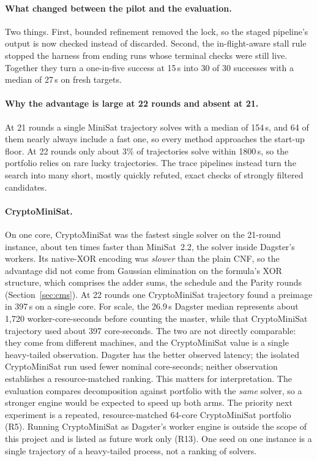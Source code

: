 \documentclass[11pt,a4paper]{article}
\begin{document}
\paragraph{What changed between the pilot and the evaluation.} Two things. First, bounded refinement
removed the lock, so the staged pipeline's output is now checked instead of discarded. Second, the
in-flight-aware stall rule stopped the harness from ending runs whose terminal checks were still
live. Together they turn a one-in-five success at 15\,s into 30 of 30 successes with a median of
27\,s on fresh targets.

\paragraph{Why the advantage is large at 22 rounds and absent at 21.} At 21 rounds a single MiniSat
trajectory solves with a median of 154\,s, and 64 of them nearly always include a fast one, so every
method approaches the start-up floor. At 22 rounds only about 3\% of trajectories solve within
1800\,s, so the portfolio relies on rare lucky trajectories. The trace pipelines instead turn the
search into many short, mostly quickly refuted, exact checks of strongly filtered candidates.

\paragraph{CryptoMiniSat.} On one core, CryptoMiniSat was the fastest single solver on the
21-round instance, about ten times faster than MiniSat~2.2, the solver inside Dagster's workers. Its
native-XOR encoding was \emph{slower} than the plain CNF, so the advantage did not come from Gaussian
elimination on the formula's XOR structure, which comprises the adder sums, the schedule and the
Parity rounds (Section~\ref{sec:cms}). At 22 rounds one CryptoMiniSat trajectory found a preimage in 397\,s on a
single core. For scale, the 26.9\,s Dagster median
represents about 1{,}720 worker-core-seconds before counting the master, while that CryptoMiniSat
trajectory used about 397 core-seconds. The two are not directly comparable: they come from different
machines, and the CryptoMiniSat value is a single heavy-tailed observation. Dagster has the better
observed latency; the isolated CryptoMiniSat run used fewer nominal core-seconds; neither observation
establishes a resource-matched ranking. This matters for interpretation. The evaluation compares decomposition against portfolio with the \emph{same} solver,
so a stronger engine would be expected to speed up both arms. The priority next experiment is a repeated,
resource-matched 64-core CryptoMiniSat portfolio (R5). Running CryptoMiniSat as Dagster's worker
engine is outside the scope of this project and is listed as future work only (R13). One seed on one instance is a single trajectory of a heavy-tailed process, not a
ranking of solvers.
\end{document}
